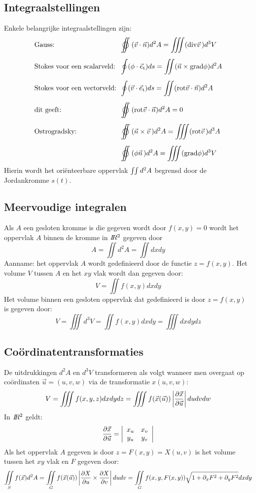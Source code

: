 \documentclass[twoside]{report}
\begin{document}
\subsection{Integraalstellingen}
Enkele belangrijke integraalstellingen zijn:
\[
\begin{array}{l@{~~}l}
\mbox{Gauss:}&\displaystyle\oiint(\vec{v}\cdot\vec{n})d^2A=\iiint({\rm div}\vvec{v})d^3V\\[5mm]
\mbox{Stokes voor een scalarveld:}&\displaystyle\oint(\phi\cdot\e{t})ds=\iint(\vec{n}\times{\rm grad}\phi)d^2A\\[5mm]
\mbox{Stokes voor een vectorveld:}&\displaystyle\oint(\vec{v}\cdot\e{t})ds=\iint({\rm rot}\vec{v}\cdot\vec{n})d^2A\\[5mm]
\mbox{dit geeft:}&\displaystyle\oiint({\rm rot}\vec{v}\cdot\vec{n})d^2A=0\\[5mm]
\mbox{Ostrogradsky:}&\displaystyle\oiint(\vec{n}\times\vvec{v})d^2A=\iiint({\rm rot}\vvec{v})d^3A\\[5mm]
\mbox{}&\displaystyle\oiint(\phi\vvec{n})d^2A=\iiint({\rm grad}\phi)d^3V
\end{array}
\]
Hierin wordt het ori\"enteerbare oppervlak $\int\hspace{-1mm}\int d^2A$
begrensd door de Jordankromme $s(t)$.

\subsection{Meervoudige integralen}
Als $A$ een gesloten kromme is die gegeven wordt door $f(x,y)=0$ wordt
het oppervlak $A$ binnen de kromme in $I\hspace{-1mm}R^2$ gegeven door
\[
A=\iint d^2A=\iint dxdy
\]
Aanname: het oppervlak $A$ wordt gedefinieerd door de functie $z=f(x,y)$.
Het volume $V$ tussen $A$ en het $xy$ vlak wordt dan gegeven door:
\[
V=\iint f(x,y)dxdy
\]
Het volume binnen een gesloten oppervlak dat gedefinieerd is door $z=f(x,y)$
is gegeven door:
\[
V=\iiint d^3V=\iint f(x,y)dxdy=\iiint dxdydz
\]

\subsection{Co\"ordinatentransformaties}
De uitdrukkingen $d^2A$ en $d^3V$ transformeren als volgt wanneer men
overgaat op co\"ordinaten $\vec{u}=(u,v,w)$ via de transformatie $x(u,v,w)$:
\[
V=\iiint f(x,y,z)dxdydz=\iiint f(\vec{x}(\vec{u}))\left|\Q{\vec{x}}{\vec{u}}\right|dudvdw
\]
In $I\hspace{-1mm}R^2$ geldt:
\[
\frac{\partial \vec{x}}{\partial \vec{u}}=\left|\begin{array}{cc}x_u&x_v\\ y_u&y_v\end{array}\right|
\]
Als het oppervlak $A$ gegeven is door $z=F(x,y)=X(u,v)$ is het volume tussen
het $xy$ vlak en $F$ gegeven door:
\[
\int\hspace{-1.5ex}\int\limits_Sf(\vec{x})d^2A=\int\hspace{-1.5ex}\int\limits_Gf(\vec{x}(\vec{u}))
\left|\frac{\partial X}{\partial u}\times\frac{\partial X}{\partial v}\right|dudv=
\int\hspace{-1.5ex}\int\limits_Gf(x,y,F(x,y))\sqrt{1+\partial_xF^2+\partial_yF^2}dxdy
\]
\end{document}
